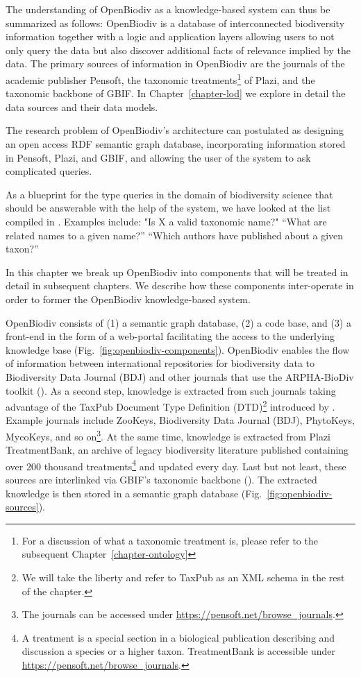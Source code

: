 The understanding of OpenBiodiv as a knowledge-based system can thus be summarized as follows: OpenBiodiv is a  database of interconnected biodiversity information together with a logic and application layers allowing users to not only query the data but also discover additional facts of relevance implied by the data. The primary sources of information in OpenBiodiv are the journals of the academic publisher Pensoft, the taxonomic treatments\footnote{For a discussion of what a taxonomic treatment is, please refer to the subsequent Chapter~\ref{chapter-ontology}} of Plazi, and the taxonomic backbone of GBIF. In Chapter~\ref{chapter-lod} we explore in detail the data sources and their data models.

The research problem of OpenBiodiv's architecture can postulated as designing an open access RDF semantic graph database, incorporating information stored in Pensoft, Plazi, and GBIF, and allowing the user of the system to ask complicated queries. 

As a blueprint for the type queries in the domain of biodiversity science that should be answerable with the help of the system, we have looked at the list compiled in \cite{pro-ibiosphere_competency_2013}. Examples include: "Is X a valid taxonomic name?" ``What are related names to a given name?'' ``Which authors have published about a given taxon?''

In this chapter we break up OpenBiodiv into components that will be treated in detail in subsequent chapters. We describe how these components inter-operate in order to former the OpenBiodiv knowledge-based system.

OpenBiodiv consists of (1) a semantic graph database, (2) a code base, and (3) a front-end in the form of a web-portal facilitating the access to the underlying knowledge base (Fig.~\ref{fig:openbiodiv-components}). OpenBiodiv enables the flow of information between international repositories for biodiversity data to Biodiversity Data Journal (BDJ) and other journals that use the ARPHA-BioDiv toolkit (\cite{penev_arpha-biodiv:_2017}). As a second step, knowledge is extracted from such journals taking advantage of the TaxPub Document Type Definition (DTD)\footnote{We will take the liberty and refer to TaxPub as an XML schema in the rest of the chapter.} introduced by \cite{catapano_taxpub:_2010}. Example journals include ZooKeys, Biodiversity Data Journal (BDJ), PhytoKeys, MycoKeys, and so on\footnote{The journals can be accessed under \url{https://pensoft.net/browse_journals}.}. At the same time, knowledge is extracted from Plazi TreatmentBank, an archive of legacy biodiversity literature published containing over 200 thousand treatments\footnote{A treatment is a special section in a biological publication describing and discussion a species or a higher taxon. TreatmentBank is accessible under \url{https://pensoft.net/browse_journals}.} and updated every day. Last but not least, these sources are interlinked via GBIF's taxonomic backbone (\cite{gbif_secretariat_gbif_2017}). The extracted knowledge is then stored in a semantic graph database (Fig.~\ref{fig:openbiodiv-sources}).


